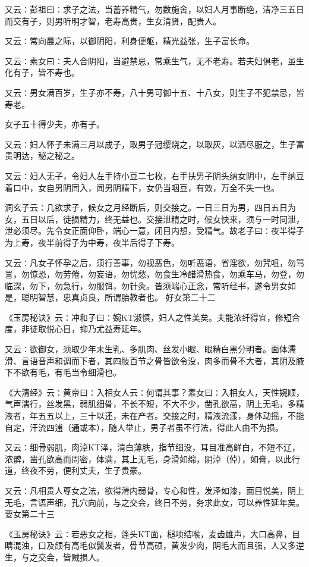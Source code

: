 \documentclass[a4paper,12pt,UTF8,twoside]{ctexbook}
\begin{document}
又云∶彭祖曰∶求子之法，当蓄养精气，勿数施舍，以妇人月事断绝，洁净三五日而交有子，则男听明才智，老寿高贵，生女清贤，配贵人。

又云∶常向晨之际，以御阴阳，利身便躯，精光益张，生子富长命。

又云∶素女曰∶夫人合阴阳，当避禁忌，常乘生气，无不老寿。若夫妇俱老，虽生化有子，皆不寿也。

又云∶男女满百岁，生子亦不寿，八十男可御十五、十八女，则生子不犯禁忌，皆寿老。

女子五十得少夫，亦有子。

又云∶妇人怀子未满三月以成子，取男子冠缨烧之，以取灰，以酒尽服之，生子富贵明达，秘之秘之。

又云∶妇人无子，令妇人左手持小豆二七枚，右手扶男子阴头纳女阴中，左手纳豆着口中，女自男阴同入，闻男阴精下，女仍当咽豆，有效，万全不失一也。

洞玄子云∶几欲求子，候女之月经断后，则交接之。一日三日为男，四日五日为女，五日以后，徒损精力，终无益也。交接泄精之时，候女快来，须与一时同泄，泄必须尽。先令女正面仰卧，端心一意，闭目内想，受精气。故老子曰∶夜半得子为上寿，夜半前得子为中寿，夜半后得子下寿。

又云∶凡女子怀孕之后，须行善事，勿视恶色，勿听恶语，省淫欲，勿咒咀，勿骂詈，勿惊恐，勿劳倦，勿妄语，勿忧愁，勿食生冷醋滑热食，勿乘车马，勿登，勿临深，勿下，勿急行，勿服饵，勿针灸。皆须端心正念，常听经书，遂令男女如是，聪明智慧，忠真贞良，所谓胎教者也。
好女第二十二

《玉房秘诀》云∶冲和子曰∶婉KT淑慎，妇人之性美矣。夫能浓纤得宜，修短合度，非徒取悦心目，抑乃尤益寿延年。

又云∶欲御女，须取少年未生乳、多肌肉、丝发小眼、眼精白黑分明者。面体濡滑、言语音声和调而下者，其四肢百节之骨皆欲令没，肉多而骨不大者，其阴及腋下不欲有毛，有毛当令细滑也。

《大清经》云∶黄帝曰∶入相女人云∶何谓其事？素女曰∶入相女人，天性婉顺，气声濡行，丝发黑，弱肌细骨，不长不短，不大不少，凿孔欲高，阴上无毛，多精液者，年五五以上，三十以还，未在产者。交接之时，精液流漾，身体动摇，不能自定，汗流四逋（通或本），随人举止，男子者虽不行法，得此人由不为损。

又云∶细骨弱肌，肉淖KT泽，清白薄肤，指节细没，耳目准高鲜白，不短不辽，浓髀，凿孔欲高而周密，体满，其上无毛，身滑如绵，阴淖（倬），如膏，以此行道，终夜不劳，便利丈夫，生子贵豪。

又云∶凡相贵人尊女之法，欲得滑内弱骨，专心和性，发泽如漆，面目悦美，阴上无毛，言语声细，孔穴向前，与之交会，终日不劳，务求此女，可以养性延年矣。
要女第二十三

《玉房秘诀》云∶若恶女之相，蓬头KT面，槌项结喉，麦齿雄声，大口高鼻，目睛混浊，口及颌有高毛似鬓发者，骨节高硕，黄发少肉，阴毛大而且强，人又多逆生，与之交会，皆贼损人。
\end{document}
